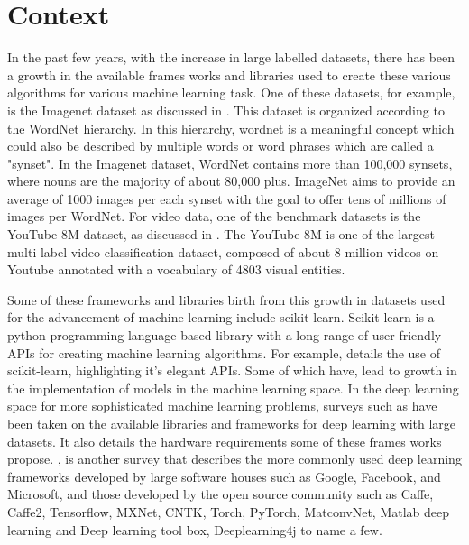 \section{Context}
In the past few years, with the increase in large labelled datasets, there has been a growth in the available frames works and libraries used to create these various algorithms for various machine learning task.  One of these datasets, for example, is the Imagenet dataset as discussed in \citep{JiaDeng2009IAlh}. 
This dataset is organized according to the WordNet hierarchy. In this hierarchy, wordnet is a meaningful concept which could also be described by multiple words or word phrases which are called a "synset". 
In the Imagenet dataset, WordNet contains more than 100,000 synsets, where nouns are the majority of about 80,000 plus. ImageNet aims to provide an average of 1000 images per each synset with the goal to offer tens of millions of images per WordNet. 
For video data, one of the benchmark datasets is the YouTube-8M dataset, as discussed in \citep{45619}.  
The YouTube-8M  is one of the largest multi-label video classification dataset, composed of about 8 million videos on Youtube annotated with a vocabulary of 4803 visual entities.  

Some of these frameworks and libraries birth from this growth in datasets used for the advancement of machine learning include scikit-learn.  Scikit-learn is a python programming language based library with a long-range of user-friendly APIs for creating machine learning algorithms. For example, \citep{DBLPjournalscorrBuitinckLBPMGNPGGLVJHV13} details the use of scikit-learn, highlighting it's elegant APIs.  Some of which have, lead to growth in the implementation of models in the machine learning space. In the deep learning space for more sophisticated machine learning problems, surveys such as \citep{Nguyen2019} have been taken on the available libraries and frameworks for deep learning with large datasets. It also details the hardware requirements some of these frames works propose.
\citep{Wang2019}, is another survey that describes the more commonly used deep learning frameworks developed by large software houses such as Google, Facebook, and Microsoft, and those developed by the open source community such as Caffe, Caffe2, Tensorflow, MXNet, CNTK, Torch, PyTorch,  MatconvNet, Matlab deep learning and Deep learning tool box, Deeplearning4j to name a few.
    
